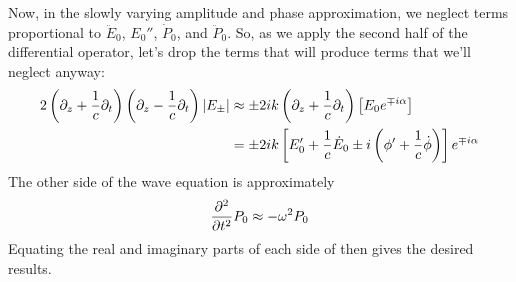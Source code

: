 \documentclass[12pt]{article}
\begin{document}
Now, in the slowly varying amplitude and phase approximation, we neglect terms proportional to $\ddot{E}_0$, $E_0''$, $\dot{P}_0$, and $\ddot{P}_0$.
So, as we apply the second half of the differential operator, let's drop the terms that will produce terms that we'll neglect anyway:
\begin{align*}
    2\left(\partial_z + \frac{1}{c}\partial_t\right)\left(\partial_z - \frac{1}{c}\partial_t\right)\abs{E_\pm} &\approx \pm2ik \left(\partial_z + \frac{1}{c}\partial_t\right)\left[E_0e^{\mp i\alpha}\right] \\
    &= \pm 2ik\left[E_0'  + \frac{1}{c}\dot{E}_0 \pm i\left(\phi' + \frac{1}{c}\dot\phi\right)\right]e^{\mp i\alpha}
\end{align*}
The other side of the wave equation is approximately
\[ \pdv[2]{t}P_0 \approx -\omega^2 P_0 \]
Equating the real and imaginary parts of each side of then gives the desired results.
\end{document}
